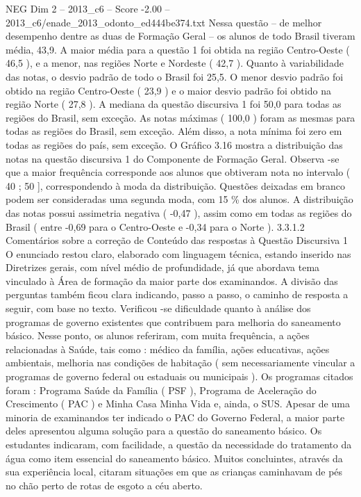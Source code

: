 \begin{textsample}{NEG Dim 2 – 2013\_c6 – Score -2.00 – 2013\_c6/enade\_2013\_odonto\_ed444be374.txt}
Nessa questão – de melhor desempenho dentre as duas de Formação Geral – os alunos de todo Brasil tiveram média, 43,9.
A maior média para a questão 1 foi obtida na região Centro-Oeste ( 46,5 ), e a menor, nas regiões Norte e Nordeste ( 42,7 ).
Quanto à variabilidade das notas, o desvio padrão de todo o Brasil foi 25,5.
O menor desvio padrão foi obtido na região Centro-Oeste ( 23,9 ) e o maior desvio padrão foi obtido na região Norte ( 27,8 ).
A mediana da questão discursiva 1 foi 50,0 para todas as regiões do Brasil, sem exceção.
As notas máximas ( 100,0 ) foram as mesmas para todas as regiões do Brasil, sem exceção.
Além disso, a nota mínima foi zero em todas as regiões do país, sem exceção.
O Gráfico 3.16 mostra a distribuição das notas na questão discursiva 1 do Componente de Formação Geral.
Observa -se que a maior frequência corresponde aos alunos que obtiveram nota no intervalo ( 40 ; 50 ], correspondendo à moda da distribuição.
Questões deixadas em branco podem ser consideradas uma segunda moda, com 15 \% dos alunos.
A distribuição das notas possui assimetria negativa ( -0,47 ), assim como em todas as regiões do Brasil ( entre -0,69 para o Centro-Oeste e -0,34 para o Norte ). 3.3.1.2 Comentários sobre a correção de Conteúdo das respostas à Questão Discursiva 1 O enunciado restou claro, elaborado com linguagem técnica, estando inserido nas Diretrizes gerais, com nível médio de profundidade, já que abordava tema vinculado à Área de formação da maior parte dos examinandos.
A divisão das perguntas também ficou clara indicando, passo a passo, o caminho de resposta a seguir, com base no texto.
Verificou -se dificuldade quanto à análise dos programas de governo existentes que contribuem para melhoria do saneamento básico.
Nesse ponto, os alunos referiram, com muita frequência, a ações relacionadas à Saúde, tais como : médico da família, ações educativas, ações ambientais, melhoria nas condições de habitação ( sem necessariamente vincular a programas de governo federal ou estaduais ou municipais ).
Os programas citados foram : Programa Saúde da Família ( PSF ), Programa de Aceleração do Crescimento ( PAC ) e Minha Casa Minha Vida e, ainda, o SUS.
Apesar de uma minoria de examinandos ter indicado o PAC do Governo Federal, a maior parte deles apresentou alguma solução para a questão do saneamento básico.
Os estudantes indicaram, com facilidade, a questão da necessidade do tratamento da água como item essencial do saneamento básico.
Muitos concluintes, através da sua experiência local, citaram situações em que as crianças caminhavam de pés no chão perto de rotas de esgoto a céu aberto.

\end{textsample}
